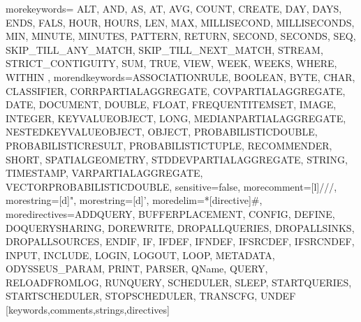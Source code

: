    {morekeywords={%
ALT, AND, AS, AT, AVG, COUNT, CREATE, DAY, DAYS, ENDS, FALS, HOUR, HOURS, LEN, MAX, MILLISECOND, MILLISECONDS, MIN, MINUTE, MINUTES, PATTERN, RETURN, SECOND, SECONDS, SEQ, SKIP_TILL_ANY_MATCH, SKIP_TILL_NEXT_MATCH, STREAM, STRICT_CONTIGUITY, SUM, TRUE, VIEW, WEEK, WEEKS, WHERE, WITHIN%
      },%
   morendkeywords={ASSOCIATIONRULE, BOOLEAN, BYTE, CHAR, CLASSIFIER, CORRPARTIALAGGREGATE, COVPARTIALAGGREGATE, DATE, DOCUMENT, DOUBLE, FLOAT, FREQUENTITEMSET, IMAGE, INTEGER, KEYVALUEOBJECT, LONG, MEDIANPARTIALAGGREGATE, NESTEDKEYVALUEOBJECT, OBJECT, PROBABILISTICDOUBLE, PROBABILISTICRESULT, PROBABILISTICTUPLE, RECOMMENDER, SHORT, SPATIALGEOMETRY, STDDEVPARTIALAGGREGATE, STRING, TIMESTAMP, VARPARTIALAGGREGATE, VECTORPROBABILISTICDOUBLE},%
   sensitive=false,
   morecomment=[l]///,%
   morestring=[d]",%
   morestring=[d]',%
   moredelim=*[directive]\#,%
   moredirectives={ADDQUERY, BUFFERPLACEMENT, CONFIG, DEFINE, DOQUERYSHARING, DOREWRITE, DROPALLQUERIES, DROPALLSINKS, DROPALLSOURCES, ENDIF, IF, IFDEF, IFNDEF, IFSRCDEF, IFSRCNDEF, INPUT, INCLUDE, LOGIN, LOGOUT, LOOP, METADATA, ODYSSEUS_PARAM, PRINT, PARSER, QName, QUERY, RELOADFROMLOG, RUNQUERY, SCHEDULER, SLEEP, STARTQUERIES, STARTSCHEDULER, STOPSCHEDULER, TRANSCFG, UNDEF}%
}[keywords,comments,strings,directives]

